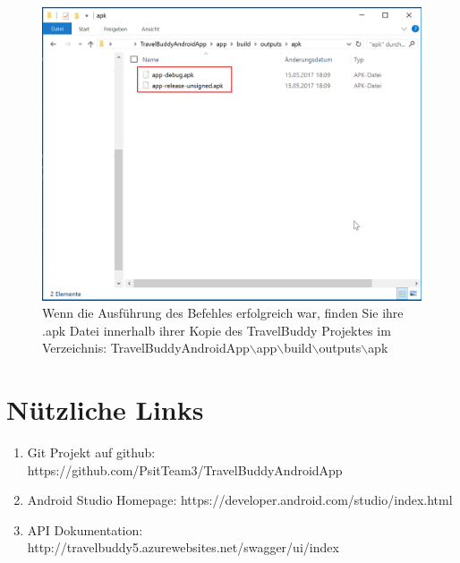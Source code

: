 \documentclass[a4paper,10pt,xetex]{article}
\begin{document}
\begin{figure}
  \centering
  \includegraphics[width=\textwidth]{Installation/4-2}
  \caption{Wenn die Ausführung des Befehles erfolgreich war, finden Sie ihre .apk Datei innerhalb ihrer Kopie des TravelBuddy Projektes im Verzeichnis: TravelBuddyAndroidApp$\backslash$app$\backslash$build$\backslash$outputs$\backslash$apk}
\end{figure}

\section{Nützliche Links}
  \begin{enumerate}
    \item Git Projekt auf github: https://github.com/PsitTeam3/TravelBuddyAndroidApp
    \item Android Studio Homepage: https://developer.android.com/studio/index.html
    \item API Dokumentation: http://travelbuddy5.azurewebsites.net/swagger/ui/index
  \end{enumerate}
\end{document}
